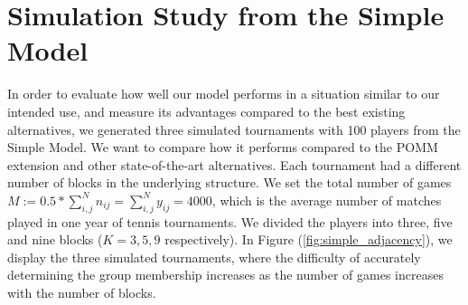 \documentclass[11pt]{amsart}
\begin{document}
\begin{comment}
\item Prediction error: making prediction on the match score between two players is also possible within this framework. Once we have obtained the MCMC samples, we can retrieve the posterior predictive distribution.

Let us assume $i^\star$ is a new player . The posterior predictive is:
\begin{align}
p(y_{i^\star j}| \textbf{Y}) &= \int p(z| \{ \textbf{Y}\setminus y_{i^\star} \})  \cdot p(y_{i^\star j} | z ) dz \\
&\approx \frac{1}{T} \sum_{t = 1}^{T} \sum_{z_i=1}^{K}  p(y_{i^\star j}| z_j^{(t)}) \\
&=  \frac{1}{T} \sum_{t = 1}^{T} \sum_{z_{i^\star} =1}^{K}  p_{z_{i^\star}, z_j^{(t)}}^{y_{i^\star j} } \cdot (1-p_{z_{i^\star}, z_j^{(t)}})^{n_{i^\star j} -  y_{i^\star j}} \quad \quad \text{for }y_{i^\star j} = 0,\ldots, n_{i^\star j} \\
\end{align} 
where $z_j^{(t)} \sim p(z|Y)$
\end{itemize}
\end{comment}

\clearpage

\section{Simulation Study from the Simple Model}

In order to evaluate how well our model performs in a situation similar to our intended use, and measure its advantages compared to the best existing alternatives, we generated three simulated tournaments with 100 players from the Simple Model. We want to compare how it performs compared to the POMM extension and other state-of-the-art alternatives. Each tournament had a different number of blocks in the underlying structure. We set the total number of games $M := 0.5* \sum_{i,j}^N n_{ij}= \sum_{i,j}^N y_{ij} = 4000$, which is the average number of matches played in one year of tennis tournaments. We divided the players into three, five and nine blocks ($K = 3,5,9$ respectively). In Figure (\ref{fig:simple_adjacency}), we display the three simulated tournaments, where the difficulty of accurately determining the group membership increases as the number of games increases with the number of blocks.
\end{document}
